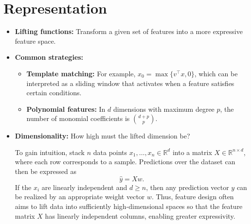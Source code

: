 \documentclass[a4paper]{article}
\begin{document}
\section{Representation}
\begin{itemize}
    \item \textbf{Lifting functions:} Transform a given set of features into a more expressive feature space.
    \item \textbf{Common strategies:}
    \begin{itemize}
        \item \textbf{Template matching:} For example, $x_0 = \max\{v^\top x, 0\}$, which can be interpreted as a sliding window that activates when a feature satisfies certain conditions.
        \item \textbf{Polynomial features:} In $d$ dimensions with maximum degree $p$, the number of monomial coefficients is $\binom{d+p}{p}$.
    \end{itemize}
    \item \textbf{Dimensionality:} How high must the lifted dimension be?  

    To gain intuition, stack $n$ data points $x_1, \ldots, x_n \in \mathbb{R}^d$ into a matrix $X \in \mathbb{R}^{n \times d}$, where each row corresponds to a sample. Predictions over the dataset can then be expressed as
    \[
    \hat{y} = Xw.
    \]
    If the $x_i$ are linearly independent and $d \geq n$, then any prediction vector $y$ can be realized by an appropriate weight vector $w$. Thus, feature design often aims to lift data into sufficiently high-dimensional spaces so that the feature matrix $X$ has linearly independent columns, enabling greater expressivity.
\end{itemize}
\end{document}
